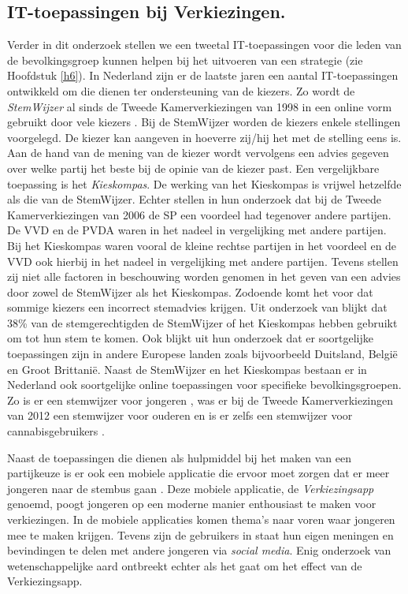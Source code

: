 \subsection{IT-toepassingen bij Verkiezingen.}
Verder in dit onderzoek stellen we een tweetal IT-toepassingen voor die leden van de bevolkingsgroep kunnen helpen bij het uitvoeren van een strategie (zie Hoofdstuk \ref{h6}). In Nederland zijn er de laatste jaren een aantal IT-toepassingen ontwikkeld om die dienen ter ondersteuning van de kiezers. Zo wordt de \textit{StemWijzer} al sinds de Tweede Kamerverkiezingen van 1998 in een online vorm gebruikt door vele kiezers \citep{kleinnijenhuis2007nederland}. Bij de StemWijzer worden de kiezers enkele stellingen voorgelegd. De kiezer kan aangeven in hoeverre zij/hij het met de stelling eens is. Aan de hand van de mening van de kiezer wordt vervolgens een advies gegeven over welke partij het beste bij de opinie van de kiezer past. Een vergelijkbare toepassing is het \textit{Kieskompas}. De werking van het Kieskompas is vrijwel hetzelfde als die van de StemWijzer. Echter stellen \cite{kleinnijenhuis2007nederland} in hun onderzoek dat bij de Tweede Kamerverkiezingen van 2006 de SP een voordeel had tegenover andere partijen. De VVD en de PVDA waren in het nadeel in vergelijking met andere partijen. Bij het Kieskompas waren vooral de kleine rechtse partijen in het voordeel en de VVD ook hierbij in het nadeel in vergelijking met andere partijen. Tevens stellen zij niet alle factoren in beschouwing worden genomen in het geven van een advies door zowel de StemWijzer als het Kieskompas. Zodoende komt het voor dat sommige kiezers een incorrect stemadvies krijgen. Uit onderzoek van \cite{garzia2012voting} blijkt dat 38\% van de stemgerechtigden de StemWijzer of het Kieskompas hebben gebruikt om tot hun stem te komen. Ook blijkt uit hun onderzoek dat er soortgelijke toepassingen zijn in andere Europese landen zoals bijvoorbeeld Duitsland, Belgi\"{e} en Groot Brittani\"{e}. Naast de StemWijzer en het Kieskompas bestaan er in Nederland ook soortgelijke online toepassingen voor specifieke bevolkingsgroepen. Zo is er een stemwijzer voor jongeren \citep{Jonge36:online}, was er bij de Tweede Kamerverkiezingen van 2012 een stemwijzer voor ouderen \citep{Stemw79:online,Stemw68:online} en is er zelfs een stemwijzer voor cannabisgebruikers \citep{Canna56:online}.

Naast de toepassingen die dienen als hulpmiddel bij het maken van een partijkeuze is er ook een mobiele applicatie die ervoor moet zorgen dat er meer jongeren naar de stembus gaan \citep{Verki80:online}. Deze mobiele applicatie, de \textit{Verkiezingsapp} genoemd, poogt jongeren op een moderne manier enthousiast te maken voor verkiezingen. In de mobiele applicaties komen thema's naar voren waar jongeren mee te maken krijgen. Tevens zijn de gebruikers in staat hun eigen meningen en bevindingen te delen met andere jongeren via \textit{social media}. Enig onderzoek van wetenschappelijke aard ontbreekt echter als het gaat om het effect van de Verkiezingsapp. 

